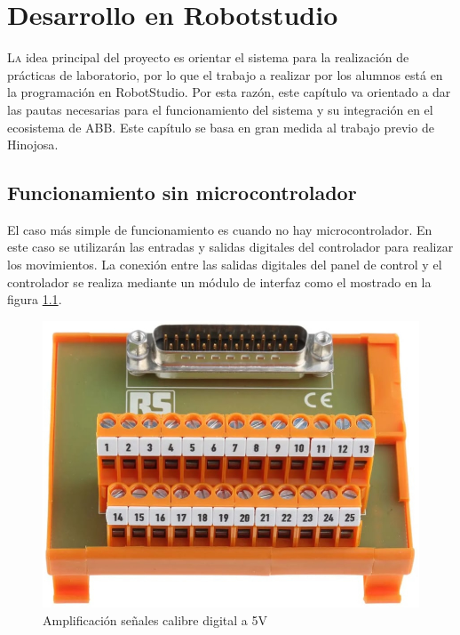 \chapter{Desarrollo en Robotstudio}\label{chp-06}

\lettrine[lraise=-0.1, lines=2, loversize=0.2]{L}a idea principal del proyecto es orientar el sistema para la realización de prácticas de 
laboratorio, por lo que el trabajo a realizar por los alumnos está en la programación en 
RobotStudio. Por esta razón, este capítulo va orientado a dar las pautas necesarias para el 
funcionamiento del sistema y su integración en el ecosistema de ABB. Este capítulo se basa 
en gran medida al trabajo previo de Hinojosa\cite{rea}.

\section{Funcionamiento sin microcontrolador}

El caso más simple de funcionamiento es cuando no hay microcontrolador. En este caso se
utilizarán las entradas y salidas digitales del controlador para realizar los movimientos.
La conexión entre las salidas digitales del panel de control y el controlador se realiza mediante 
un módulo de interfaz como el mostrado en la figura \ref{fig:interfazfisicadigital}.

\begin{figure}[hbtp]
    \centering
    \includegraphics[width=\textwidth/2]{06-robotstudio/interfazdigital.jpg}
    \caption{Amplificación señales calibre digital a 5V}
    \label{fig:interfazfisicadigital}
    \end{figure}

